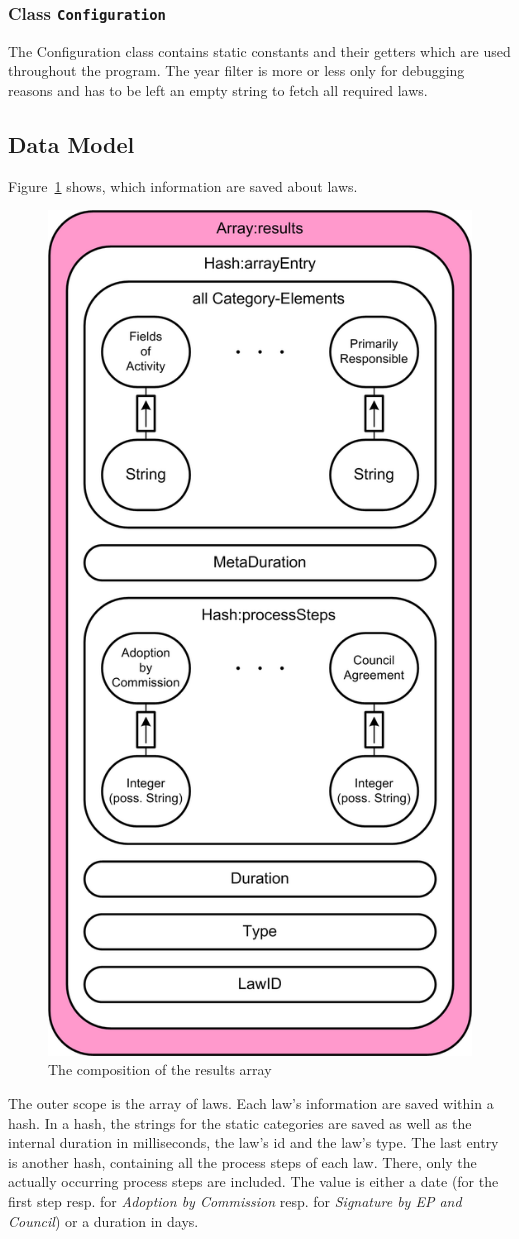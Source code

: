 \documentclass{scrartcl}
\begin{document}
\subsubsection{Class \texttt{Configuration}}
The Configuration class contains static constants and their getters which are used throughout the program. The year filter is more or less only for debugging reasons and has to be left an empty string to fetch all required laws.



\subsection{Data Model}
Figure~\ref{DataModel} shows, which information are saved about laws.
  \begin{figure}[ht]
  \begin{center}
  \includegraphics[width = 0.5 \textwidth]{Data_Model.png}
  \caption{The composition of the results array}
  \label{DataModel}
  \end{center}
  \end{figure}

The outer scope is the array of laws. Each law's information are saved within a hash. In a hash, the strings for the static categories are saved as well as the internal duration in milliseconds, the law's id and the law's type. The last entry is another hash, containing all the process steps of each law. There, only the actually occurring process steps are included. The value is either a date (for the first step resp. for \textit{Adoption by Commission} resp. for \textit{Signature by EP and Council}) or a duration in days.
\end{document}
